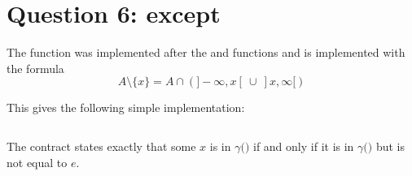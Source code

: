 \section{Question 6: except}

The  function was implemented after the  and
 functions and is implemented with the formula
$$ A \setminus \{x\} = A \cap (]-\infty, x[~\cup~]x, \infty[) $$

This gives the following simple implementation:
\inputminted{\whyml}{why3code/except.mlw}

The contract states exactly that some $x$ is in $\gamma($$)$ if
and only if it is in $\gamma($$)$ but is not equal to $e$.
